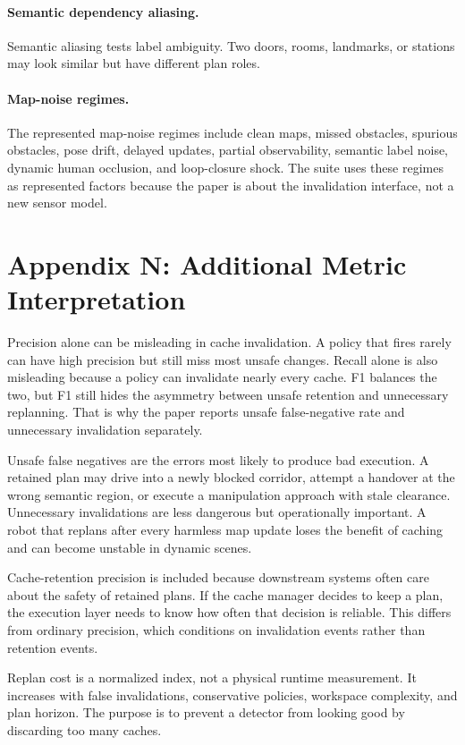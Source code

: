 \documentclass{article}
\begin{document}
\paragraph{Semantic dependency aliasing.}
Semantic aliasing tests label ambiguity. Two doors, rooms, landmarks, or stations may look similar but have different plan roles.

\paragraph{Map-noise regimes.}
The represented map-noise regimes include clean maps, missed obstacles, spurious obstacles, pose drift, delayed updates, partial observability, semantic label noise, dynamic human occlusion, and loop-closure shock. The suite uses these regimes as represented factors because the paper is about the invalidation interface, not a new sensor model.

\section{Appendix N: Additional Metric Interpretation}

Precision alone can be misleading in cache invalidation. A policy that fires rarely can have high precision but still miss most unsafe changes. Recall alone is also misleading because a policy can invalidate nearly every cache. F1 balances the two, but F1 still hides the asymmetry between unsafe retention and unnecessary replanning. That is why the paper reports unsafe false-negative rate and unnecessary invalidation separately.

Unsafe false negatives are the errors most likely to produce bad execution. A retained plan may drive into a newly blocked corridor, attempt a handover at the wrong semantic region, or execute a manipulation approach with stale clearance. Unnecessary invalidations are less dangerous but operationally important. A robot that replans after every harmless map update loses the benefit of caching and can become unstable in dynamic scenes.

Cache-retention precision is included because downstream systems often care about the safety of retained plans. If the cache manager decides to keep a plan, the execution layer needs to know how often that decision is reliable. This differs from ordinary precision, which conditions on invalidation events rather than retention events.

Replan cost is a normalized index, not a physical runtime measurement. It increases with false invalidations, conservative policies, workspace complexity, and plan horizon. The purpose is to prevent a detector from looking good by discarding too many caches.
\end{document}
